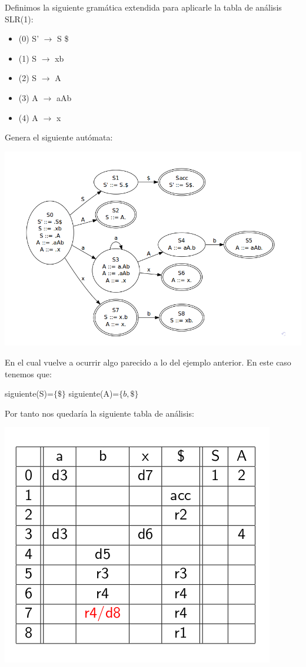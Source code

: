 \documentclass{apuntes}
\begin{document}
\begin{example}
Definimos la siguiente gramática extendida para aplicarle la tabla de análisis SLR(1):

\begin{itemize}
\item (0) S' $\rightarrow$ S \$
\item (1) S $\rightarrow$ xb
\item (2) S $\rightarrow$ A
\item (3) A $\rightarrow$ aAb
\item (4) A $\rightarrow$ x
\end{itemize}

Genera el siguiente autómata:
\begin{center}
\includegraphics[scale=0.5]{img/automataslr1c1.jpg}
\end{center}

En el cual vuelve a ocurrir algo parecido a lo del ejemplo anterior. En este caso tenemos que:

siguiente(S)=$\{\$\}$
siguiente(A)=$\{b,\$\}$

Por tanto nos quedaría la siguiente tabla de análisis:

\begin{center}
\includegraphics[scale=0.4]{img/tablaanalisisslr1c1.jpg}
\end{center}
\end{example}
\end{document}
